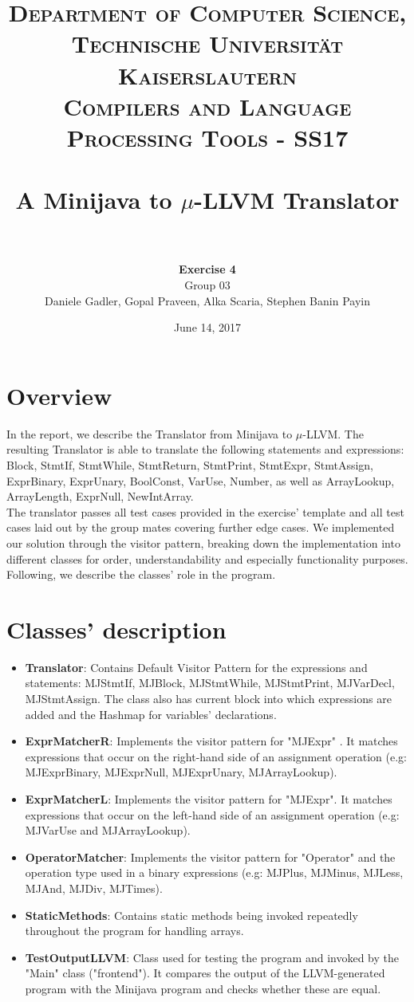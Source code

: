 \documentclass[paper=a4, fontsize=11pt]{scrartcl}
\title{
		\usefont{OT1}{bch}{b}{n}
		\normalfont \normalsize \textsc{Department of Computer Science, Technische Universit\"at Kaiserslautern\\
Compilers and Language Processing Tools - SS17
		} \\ [2pt]
		\horrule{0.5pt} \\[0.4cm]
		\huge A Minijava to $\mu$-LLVM Translator\\
		\horrule{2pt} \\[0.5cm]
}
\author{	
		\textbf{Exercise 4}\\
		Group 03\\
        Daniele Gadler, Gopal Praveen, Alka Scaria, Stephen Banin Payin \\[-1pt]		\normalsize
}
\date{June 14, 2017}
\numberwithin{equation}{section}		%
\numberwithin{figure}{section}			%
\numberwithin{table}{section}				%
\begin{document}
\maketitle

\section*{Overview}
In the report, we describe the Translator from Minijava to $\mu$-LLVM. The resulting Translator is able to translate the following statements and expressions: Block, StmtIf, StmtWhile, StmtReturn, StmtPrint, StmtExpr, StmtAssign, ExprBinary, ExprUnary, BoolConst, VarUse, Number, as well as ArrayLookup, ArrayLength, ExprNull, NewIntArray. \\
The translator passes all test cases provided in the exercise' template and all test cases laid out by the group mates covering further edge cases.
We implemented our solution through the visitor pattern, breaking down the implementation into different classes for order, understandability and especially functionality purposes. Following, we describe the classes' role in the program. 


\section*{Classes' description}
\begin{itemize}
	\item \textbf{Translator}: Contains Default Visitor Pattern for the expressions and statements: MJStmtIf, MJBlock, MJStmtWhile, MJStmtPrint, MJVarDecl, MJStmtAssign. The class also has current block into which expressions are added and the Hashmap for variables' declarations.
	\item \textbf{ExprMatcherR}: Implements the visitor pattern for "MJExpr" . It matches expressions that occur on the right-hand side of an assignment operation (e.g: MJExprBinary, MJExprNull, MJExprUnary, MJArrayLookup). 
	\item \textbf{ExprMatcherL}: Implements the visitor pattern for "MJExpr". It matches expressions that occur on the left-hand side of an assignment operation (e.g: MJVarUse and MJArrayLookup). 
	\item \textbf{OperatorMatcher}: Implements the visitor pattern for "Operator" and the operation type used in a binary expressions (e.g: MJPlus, MJMinus, MJLess, MJAnd, MJDiv, MJTimes). 
	\item \textbf{StaticMethods}: Contains static methods being invoked repeatedly throughout the program for handling arrays. 
	\item \textbf{TestOutputLLVM}: Class used for testing the program and invoked by the "Main" class ("frontend"). It compares the output of the LLVM-generated program with the Minijava program and checks whether these are equal. 
\end{itemize}
\end{document}
